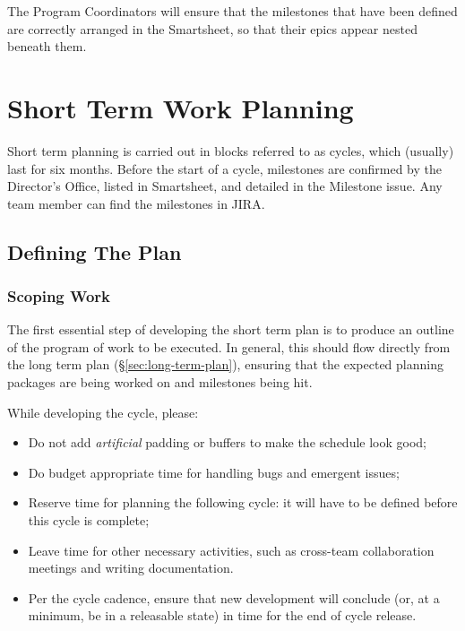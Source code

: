 \begin{itemize}
The Program Coordinators will ensure that the milestones that have been defined are correctly arranged in the Smartsheet, so that their epics appear nested beneath them.


\section{Short Term Work Planning} \label{sec:cycle-plan}

Short term planning is carried out in blocks referred to as \glspl{cycle}, which (usually) last for six months.
Before the start of a \gls{cycle}, milestones are confirmed by the Director's Office, listed in Smartsheet, and detailed in the Milestone issue. Any team member can find the milestones in \gls{JIRA}.

\subsection{Defining The Plan}

\subsubsection{Scoping Work}

The first essential step of developing the short term plan is to produce an outline of the program of work to be executed.
In general, this should flow directly from the long term plan (\S\ref{sec:long-term-plan}), ensuring that the expected planning packages are being worked on and milestones being hit.

While developing the \gls{cycle}, please:

\begin{itemize}
\item Do not add \emph{artificial} padding or buffers to make the schedule look good;
\item Do budget appropriate time for handling bugs and emergent issues;
\item Reserve time for planning the following \gls{cycle}: it will have to be defined before this \gls{cycle} is complete;
\item Leave time for other necessary activities, such as cross-team collaboration meetings and writing documentation.
\item Per the \gls{cycle} cadence, ensure that new development will conclude (or, at a minimum, be in a releasable state) in time for the end of \gls{cycle} release.
\end{itemize}


\end{itemize}
